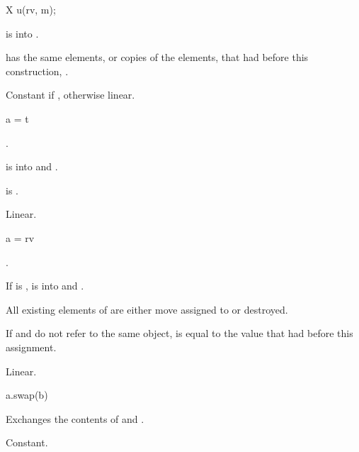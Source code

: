 \begin{itemdecl}
X u(rv, m);
\end{itemdecl}

\begin{itemdescr}
\pnum
\expects
{} is  into .

\pnum
\ensures
{} has the same elements, or copies of the elements,
that  had before this construction,
.

\pnum
\complexity
Constant if , otherwise linear.
\end{itemdescr}

\begin{itemdecl}
a = t
\end{itemdecl}

\begin{itemdescr}
\pnum
\result
{}.

\pnum
\expects
{} is  into  and
.

\pnum
\ensures
{} is .

\pnum
\complexity
Linear.
\end{itemdescr}

%
\begin{itemdecl}
a = rv
\end{itemdecl}

\begin{itemdescr}
\pnum
\result
{}.

\pnum
\expects
If
is ,
 is  into  and
.

\pnum
\effects
All existing elements of  are either move assigned to or destroyed.

\pnum
\ensures
If  and  do not refer to the same object,
 is equal to the value that  had before this assignment.

\pnum
\complexity
Linear.
\end{itemdescr}

%
\begin{itemdecl}
a.swap(b)
\end{itemdecl}

\begin{itemdescr}
\pnum
\result
{}

\pnum
\effects
Exchanges the contents of  and .

\pnum
\complexity
Constant.
\end{itemdescr}


